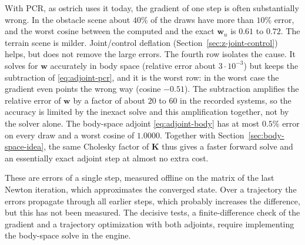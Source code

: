 With PCR, as ostrich uses it today, the gradient of one step is often
substantially wrong. In the obstacle scene about $40\%$ of the draws have
more than $10\%$ error, and the worst cosine between the computed and the
exact $\mathbf{w}_u$ is $0.61$ to $0.72$. The terrain scene is milder.
Joint/control deflation (Section~\ref{sec:z-joint-control}) helps, but
does not remove the large errors. The fourth row isolates the cause. It
solves for $\mathbf{w}$ accurately in body space (relative error about
$3 \cdot 10^{-3}$) but keeps the subtraction of \eqref{eq:adjoint-pcr}, and
it is the worst row: in the worst case the gradient even points the wrong
way (cosine $-0.51$). The subtraction amplifies the relative error of
$\mathbf{w}$ by a factor of about $20$ to $60$ in the recorded systems, so
the accuracy is limited by the inexact solve and this amplification
together, not by the solver alone.
The body-space adjoint \eqref{eq:adjoint-body} has at most $0.5\%$ error on
every draw and a worst cosine of $1.0000$. Together with
Section~\ref{sec:body-space-idea}, the same Cholesky factor of $\mathbf{K}$
thus gives a faster forward solve and an essentially exact adjoint step at
almost no extra cost.

These are errors of a single step, measured offline on the matrix of the
last Newton iteration, which approximates the converged state. Over a
trajectory the errors propagate through all earlier steps, which probably
increases the difference, but this has not been measured. The decisive
tests, a finite-difference check of the gradient and a trajectory
optimization with both adjoints, require implementing the body-space solve
in the engine.
